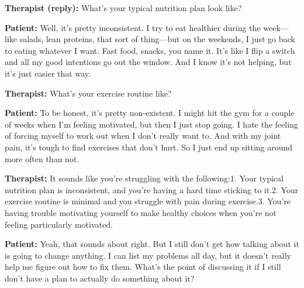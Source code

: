 \noindent\textbf{Therapist (reply):} What's your typical nutrition plan look like?

\noindent\textbf{Patient:} Well, it's pretty inconsistent. I try to eat healthier during the week---like salads, lean proteins, that sort of thing---but on the weekends, I just go back to eating whatever I want. Fast food, snacks, you name it. It's like I flip a switch and all my good intentions go out the window. And I know it's not helping, but it's just easier that way.

\noindent\textbf{Therapist:} What's your exercise routine like?

\noindent\textbf{Patient:} To be honest, it's pretty non-existent. I might hit the gym for a couple of weeks when I'm feeling motivated, but then I just stop going. I hate the feeling of forcing myself to work out when I don't really want to. And with my joint pain, it's tough to find exercises that don't hurt. So I just end up sitting around more often than not.

\noindent\textbf{Therapist:} It sounds like you're struggling with the following:1. Your typical nutrition plan is inconsistent, and you're having a hard time sticking to it.2. Your exercise routine is minimal and you struggle with pain during exercise.3. You're having trouble motivating yourself to make healthy choices when you're not feeling particularly motivated.

\noindent\textbf{Patient:} Yeah, that sounds about right. But I still don't get how talking about it is going to change anything. I can list my problems all day, but it doesn't really help me figure out how to fix them. What's the point of discussing it if I still don't have a plan to actually do something about it?


\normalsize

